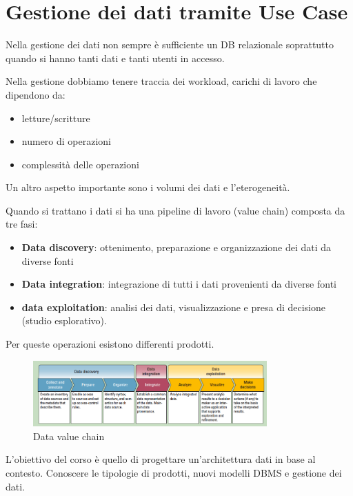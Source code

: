 \section{Gestione dei dati tramite Use Case}
Nella gestione dei dati non sempre è sufficiente un DB relazionale soprattutto
quando si hanno tanti dati e tanti utenti in accesso.

Nella gestione dobbiamo tenere traccia dei workload, carichi di lavoro che dipendono da:
\begin{itemize}
      \item letture/scritture
      \item numero di operazioni
      \item complessità delle operazioni
\end{itemize}
Un altro aspetto importante sono i volumi dei dati e l'eterogeneità.

Quando si trattano i dati si ha una pipeline di lavoro (value chain) composta da
tre fasi:
\begin{itemize}
      \item \textbf{Data discovery}: ottenimento, preparazione e organizzazione
            dei dati da diverse fonti
      \item \textbf{Data integration}: integrazione di tutti i dati provenienti da
            diverse fonti
      \item \textbf{data exploitation}: analisi dei dati, visualizzazione e presa
            di decisione (studio esplorativo).
\end{itemize}
Per queste operazioni esistono differenti prodotti.
\begin{figure}[ht]
      \centering
      \includegraphics[width=0.8\textwidth]{./img/data_chain.png}
      \caption{Data value chain}
      \label{fig:valChain}
\end{figure}

L'obiettivo del corso è quello di progettare un'architettura dati in base al 
contesto. Conoscere le tipologie di prodotti, nuovi modelli DBMS e gestione dei 
dati.


